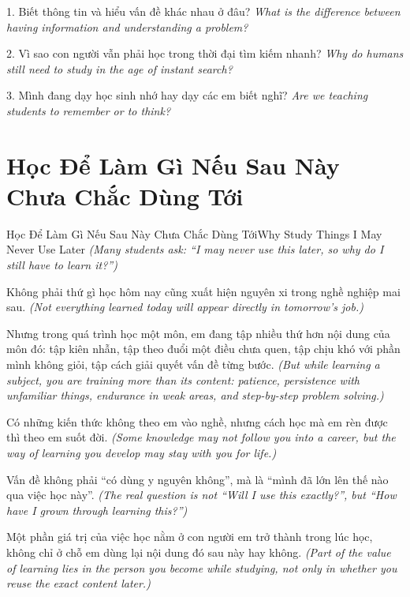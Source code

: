 \begin{tuhocnhanh}
1. Biết thông tin và hiểu vấn đề khác nhau ở đâu? \textit{What is the difference between having information and understanding a problem?}

2. Vì sao con người vẫn phải học trong thời đại tìm kiếm nhanh? \textit{Why do humans still need to study in the age of instant search?}

3. Mình đang dạy học sinh nhớ hay dạy các em biết nghĩ? \textit{Are we teaching students to remember or to think?}
\end{tuhocnhanh}
\ngancach

\section{Học Để Làm Gì Nếu Sau Này Chưa Chắc Dùng Tới}
\begin{truyen}{Học Để Làm Gì Nếu Sau Này Chưa Chắc Dùng Tới}{Why Study Things I May Never Use Later}
\textit{(Many students ask: “I may never use this later, so why do I still have to learn it?”)}

Không phải thứ gì học hôm nay cũng xuất hiện nguyên xi trong nghề nghiệp mai sau.
\textit{(Not everything learned today will appear directly in tomorrow's job.)}

Nhưng trong quá trình học một môn, em đang tập nhiều thứ hơn nội dung của môn đó: tập kiên nhẫn, tập theo đuổi một điều chưa quen, tập chịu khó với phần mình không giỏi, tập cách giải quyết vấn đề từng bước.
\textit{(But while learning a subject, you are training more than its content: patience, persistence with unfamiliar things, endurance in weak areas, and step-by-step problem solving.)}

Có những kiến thức không theo em vào nghề, nhưng cách học mà em rèn được thì theo em suốt đời.
\textit{(Some knowledge may not follow you into a career, but the way of learning you develop may stay with you for life.)}

Vấn đề không phải “có dùng y nguyên không”, mà là “mình đã lớn lên thế nào qua việc học này”.
\textit{(The real question is not “Will I use this exactly?”, but “How have I grown through learning this?”)}
\end{truyen}

\begin{baihoc}
Một phần giá trị của việc học nằm ở con người em trở thành trong lúc học, không chỉ ở chỗ em dùng lại nội dung đó sau này hay không.
\textit{(Part of the value of learning lies in the person you become while studying, not only in whether you reuse the exact content later.)}
\end{baihoc}

